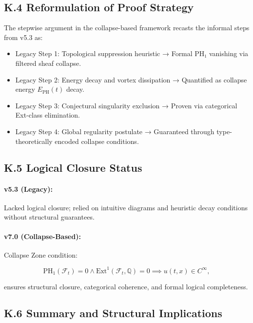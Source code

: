 \documentclass[11pt]{article}
\begin{document}
\subsection*{K.4 Reformulation of Proof Strategy}

The stepwise argument in the collapse-based framework recasts the informal steps from v5.3 as:

\begin{itemize}
  \item Legacy Step 1: Topological suppression heuristic  
    → Formal PH₁ vanishing via filtered sheaf collapse.

  \item Legacy Step 2: Energy decay and vortex dissipation  
    → Quantified as collapse energy \( E_{\mathrm{PH}}(t) \) decay.

  \item Legacy Step 3: Conjectural singularity exclusion  
    → Proven via categorical Ext-class elimination.

  \item Legacy Step 4: Global regularity postulate  
    → Guaranteed through type-theoretically encoded collapse conditions.
\end{itemize}

\subsection*{K.5 Logical Closure Status}

\paragraph{v5.3 (Legacy):}  
Lacked logical closure; relied on intuitive diagrams and heuristic decay conditions without structural guarantees.

\paragraph{v7.0 (Collapse-Based):}  
Collapse Zone condition:

\[
\mathrm{PH}_1(\mathcal{F}_t) = 0 \land \mathrm{Ext}^1(\mathcal{F}_t, \mathbb{Q}) = 0
\implies u(t, x) \in C^\infty,
\]

ensures structural closure, categorical coherence, and formal logical completeness.

\subsection*{K.6 Summary and Structural Implications}
\end{document}
